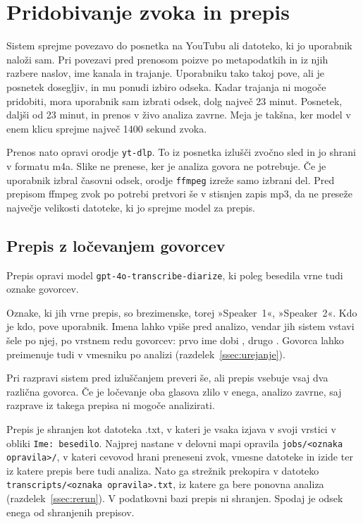 \documentclass[a4paper, 12pt]{book}
\begin{document}
\section{Pridobivanje zvoka in prepis}
\label{sec:prenos}

Sistem sprejme povezavo do posnetka na YouTubu ali datoteko, ki jo uporabnik
naloži sam. Pri povezavi pred prenosom poizve po metapodatkih in iz njih razbere naslov, ime kanala in trajanje. Uporabniku tako takoj pove, ali je posnetek dosegljiv, in mu ponudi izbiro odseka. Kadar trajanja ni mogoče pridobiti, mora uporabnik sam izbrati odsek, dolg največ 23 minut. Posnetek, daljši od 23 minut, in prenos v živo analiza zavrne. Meja je takšna, ker model v enem klicu sprejme največ 1400 sekund zvoka.

Prenos nato opravi orodje \texttt{yt-dlp}. To iz posnetka izlušči zvočno sled in jo shrani v formatu m4a. Slike ne prenese, ker je analiza govora ne potrebuje. Če je uporabnik izbral časovni odsek, orodje \texttt{ffmpeg} izreže samo izbrani del. Pred prepisom ffmpeg zvok po potrebi pretvori še v stisnjen zapis mp3, da ne preseže največje velikosti datoteke, ki jo sprejme model za prepis.

\subsection{Prepis z ločevanjem govorcev}
\label{ssec:diarizacija}

Prepis opravi model \texttt{gpt-4o-transcribe-diarize}, ki poleg besedila vrne tudi oznake govorcev.

Oznake, ki jih vrne prepis, so brezimenske, torej »Speaker~1«, »Speaker~2«. Kdo je kdo, pove uporabnik. Imena lahko vpiše pred analizo, vendar jih sistem vstavi šele po njej, po vrstnem redu govorcev: prvo ime dobi , drugo . Govorca lahko preimenuje tudi v vmesniku po analizi (razdelek~\ref{ssec:urejanje}).

Pri razpravi sistem pred izluščanjem preveri še, ali prepis vsebuje vsaj dva različna govorca. Če je ločevanje oba glasova zlilo v enega, analizo zavrne, saj razprave iz takega prepisa ni mogoče analizirati.

Prepis je shranjen kot datoteka .txt, v kateri je vsaka izjava v svoji vrstici v obliki \texttt{Ime: besedilo}. Najprej nastane v delovni mapi opravila \texttt{jobs/<oznaka opravila>/}, v kateri cevovod hrani preneseni zvok, vmesne datoteke in izide ter iz katere prepis bere tudi analiza. Nato ga strežnik prekopira v datoteko \texttt{transcripts/<oznaka opravila>.txt}, iz katere ga bere ponovna analiza (razdelek~\ref{ssec:rerun}). V podatkovni bazi prepis ni shranjen. Spodaj je odsek enega od shranjenih prepisov.
\end{document}
